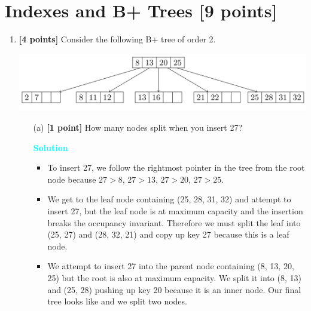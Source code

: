 \documentclass[10pt]{article}
\newenvironment{solution}
    { \begin{mdframed}[backgroundcolor=gray!10] \textcolor{cyan}{\textbf{Solution}} \\}
    {  \end{mdframed}}
\begin{document}
\newpage
\section{Indexes and B+ Trees \textbf{[9 points]}}

\begin{enumerate}

	
	\item \textbf{[4 points]}
	      Consider the following B+ tree of order 2.
	      \begin{center}
		      \includegraphics[scale=0.25]{Btree.png}
	      \end{center}
	      \begin{itemize}
		      \item[(a)] \textbf{[1 point]} How many nodes split when you insert 27?
		            \begin{solution}
			            \begin{itemize}
				            \item To insert 27, we follow the rightmost pointer in the tree from the root node because
				                  $27 > 8$, $27 > 13$, $27 > 20$, $27 > 25$.
				            \item We get to the leaf node containing (25, 28, 31, 32) and attempt to insert 27, but the leaf node
				                  is at maximum capacity and the insertion breaks the occupancy invariant. Therefore we must
				                  split the leaf into (25, 27) and (28, 32, 21) and copy up key 27 because this is a leaf node.
				            \item We attempt to insert 27 into the parent node containing (8, 13, 20, 25) but the root is also at
				                  maximum capacity. We split it into (8, 13) and (25, 28) pushing up key 20 because it is an
				                  inner node. Our final tree looks like and we split two nodes.
			            \end{itemize}
		            \end{solution}


\end{itemize}
\end{enumerate}
\end{document}
